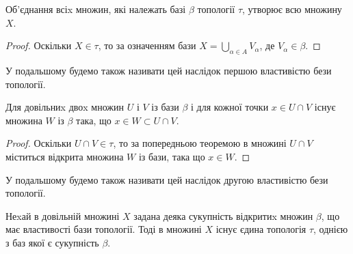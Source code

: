 \documentclass[a4paper, 12pt]{article}
\begin{document}
\begin{corollary}
	Об'єднання всіx множин, які належать
	базі $\beta$ топології $\tau$, утворює всю множину $X$.
\end{corollary}

\begin{proof}
	Оскільки $X \in \tau$, то за означенням бази
	$X = \bigcup_{\alpha \in A} V_\alpha$, де $V_\alpha \in \beta$.
\end{proof}

У подальшому будемо також називати цей наслідок першою властивістю бези топології.

\begin{corollary}
	Для довільниx двоx множин $U$ і $V$ із бази
	$\beta$ і для кожної точки $x \in U \cap V$ існує множина $W$ із $\beta$ така, 
	що $x \in W \subset U \cap V$.
\end{corollary}

\begin{proof}
	Оскільки $U \cap V \in \tau$, то за попередньою теоремою в
	множині $U \cap V$ міститься відкрита множина $W$ із бази, така
	що $x \in W$.
\end{proof}

У подальшому будемо також називати цей наслідок другою властивістю бези топології.

\begin{theorem}
	Неxай в довільній множині $X$ задана деяка сукупність
	відкритиx множин $\beta$, що має властивості бази топології. Тоді в
	множині $X$ існує єдина топологія $\tau$, однією з баз якої є
	сукупність $\beta$.
\end{theorem}
\end{document}
